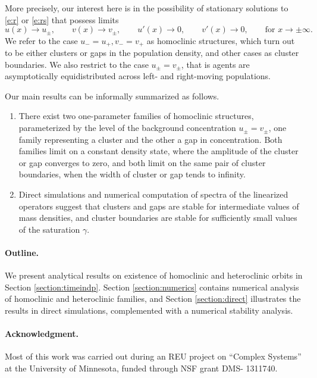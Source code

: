 \documentclass[10pt]{article}
\begin{document}
More precisely, our interest here is in the possibility of stationary solutions to \eqref{e:r} or \eqref{e:rs} that possess limits
\[
 u(x)\to u_\pm,\qquad v(x)\to v_\pm,\qquad u'(x)\to 0,\qquad v'(x)\to 0, \qquad \text{for } x\to\pm\infty.
\]
We refer to the case $u_-=u_+,v_-=v_+$ as homoclinic structures, which turn out to be either clusters or gaps in the population density, and other cases as cluster boundaries. We also restrict to the case $u_\pm=v_\pm$, that is agents are asymptotically equidistributed across left- and right-moving populations. 

Our main results can be informally summarized as follows. 
\begin{enumerate}
\item There exist two one-parameter families of homoclinic structures, parameterized by the level of the background concentration $u_\pm=v_\pm$, one family representing a cluster and the other a gap in concentration. Both families limit on a constant density state, where the amplitude of the cluster or gap converges to zero, and both limit on the same pair of cluster boundaries, when the width of cluster or gap tends to infinity. 
\item  Direct simulations and numerical computation of spectra of the linearized operators suggest that clusters and gaps are stable for intermediate values of mass densities, and cluster boundaries are stable for sufficiently small values of the saturation $\gamma$. 
\end{enumerate}

\paragraph{Outline.}
We present analytical results on existence of homoclinic and heteroclinic orbits in Section \ref{section:timeindp}. Section \ref{section:numerics} contains numerical analysis of homoclinic and heteroclinic families, and Section \ref{section:direct} illustrates the results in direct simulations, complemented with a numerical stability analysis. 

\paragraph{Acknowledgment.} Most of this work was carried out during an REU project on ``Complex Systems'' at the University of Minnesota, funded through NSF grant  DMS-
1311740. 
\end{document}
